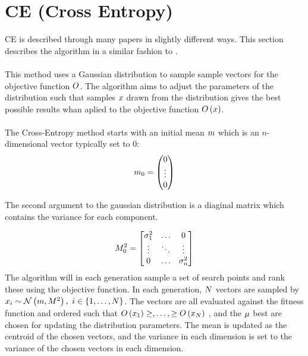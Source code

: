 \section{CE (Cross Entropy) \label{CrossEntropy}}
CE is described through many papers in 
slightly different ways. This section
describes the algorithm in a similar fashion 
to \citep{thiery:09}.\\
\\
This method uses a Gaussian distribution to 
sample sample vectors for the objective function
$O$. The algorithm aims to 
adjust the parameters of the distribution
such that samples $x$ drawn from the distribution
gives the best possible results whan aplied to the
objective function $O \left( x \right)$.\\
\\
The Cross-Entropy method starts with an initial 
mean $m$ which is an $n$-dimensional vector
typically set to 0:
\begin{align*}
m_0 = \begin{pmatrix}
0\\
\vdots\\
0
\end{pmatrix} 
\end{align*}

The second argument to the gaussian distribution is a 
diaginal matrix which contains the variance for each 
component.

\begin{align*}
M_0^{2} =
\begin{bmatrix}
\sigma_1^{2} & \hdots & 0\\
\vdots & \ddots & \vdots\\
0 & \hdots & \sigma_{n}^{2}
\end{bmatrix}
\end{align*}
The algorithm will in each generation sample a set of search points
and rank these using the objective function.
In each generation, $N$ vectors are sampled by 
$x_{i} \sim \mathcal{N} \left(m, M^{2} \right)
,\ i \in \{1,\dots,N \}$. The vectors are all evaluated 
against the fitness function and ordered such that $O \left( x_{1} \right) \geq, \dots, \geq O \left( x_{N} \right)$
, and the $\mu$ best are chosen for updating the distribution 
parameters. The mean is updated as the centroid of the chosen vectors, and
the variance in each dimension is set to the variance of the chosen vectors in each 
dimension.\\

